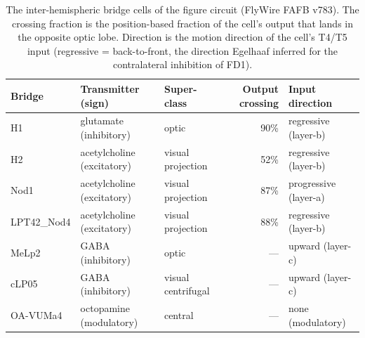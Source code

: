 \documentclass[11pt]{article}
\begin{document}
\begin{table}[t]
\centering
\caption{The inter-hemispheric bridge cells of the figure circuit (FlyWire FAFB v783). The
crossing fraction is the position-based fraction of the cell's output that lands in the opposite
optic lobe. Direction is the motion direction of the cell's T4/T5 input (regressive = back-to-front,
the direction Egelhaaf inferred for the contralateral inhibition of FD1).}
\label{tab:bridges}
\small
\begin{tabular}{@{}l l l r l@{}}
\toprule
Bridge & Transmitter (sign) & Super-class & Output crossing & Input direction \\
\midrule
H1          & glutamate (inhibitory)     & optic             & 90\% & regressive (layer-b) \\
H2          & acetylcholine (excitatory) & visual projection & 52\% & regressive (layer-b) \\
Nod1        & acetylcholine (excitatory) & visual projection & 87\% & progressive (layer-a) \\
LPT42\_Nod4 & acetylcholine (excitatory) & visual projection & 88\% & regressive (layer-b) \\
MeLp2       & GABA (inhibitory)          & optic             & ---  & upward (layer-c) \\
cLP05       & GABA (inhibitory)          & visual centrifugal& ---  & upward (layer-c) \\
OA-VUMa4    & octopamine (modulatory)    & central           & ---  & none (modulatory) \\
\bottomrule
\end{tabular}
\end{table}
\end{document}
